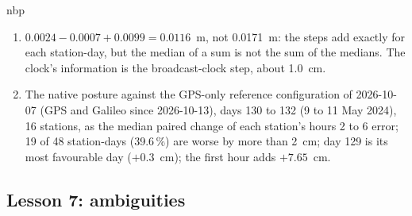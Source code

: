 \begin{answer}{nbp}
\solution
\begin{enumerate}[leftmargin=*, itemsep=1pt]
\item $0.0024 - 0.0007 + 0.0099 = 0.0116$~m, not 0.0171~m: the steps add exactly for
      each station-day, but the median of a sum is not the sum of the medians. The
      clock's information is the broadcast-clock step, about 1.0~cm.
\item The native posture against the GPS-only reference configuration of
      2026-10-07 (GPS and Galileo since 2026-10-13), days 130 to 132 (9 to 11 May 2024),
      16 stations, as the median paired change of each station's hours 2 to 6 error;
      19 of 48 station-days (39.6\,\%) are worse by more than 2~cm; day 129 is its most
      favourable day ($+0.3$~cm); the first hour adds $+7.65$~cm.
\end{enumerate}
\end{answer}

\subsection*{Lesson 7: ambiguities}

